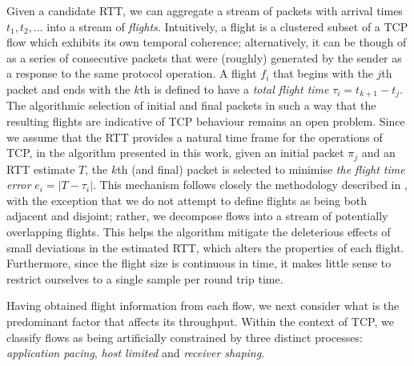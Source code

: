 Given a candidate RTT, we can aggregate a stream of packets with arrival times $t_1, t_2, \ldots$ into a stream of \emph{flights}. 
Intuitively, a flight is a clustered subset of a TCP flow which exhibits its own temporal coherence; alternatively, it can be though of as a series of consecutive packets that were (roughly) generated by the sender as a response to the same protocol operation. 
A flight $f_i$ that begins
with the $j$th packet and ends with the $k$th is defined to have a \emph{total flight time} $\tau_i = t_{k+1} - t_j$. 
The algorithmic selection of initial and final packets in such a way that the resulting flights are indicative of TCP behaviour remains an open problem. 
Since we assume that the RTT provides a natural time frame for the operations of TCP, in the algorithm presented in this work, given an initial packet $\pi_j$ and an RTT estimate $T$, the $k$th (and final) packet is selected to minimise \emph{the flight time error} $e_i = |T - \tau_i|$. 
This mechanism follows closely the methodology described in \cite{Zhang:2002p85}, with the exception that we do not attempt to define flights as being both adjacent and disjoint; rather, we decompose flows into a stream of potentially overlapping flights. 
This helps the algorithm mitigate the deleterious effects of small deviations in the estimated RTT, which alters the properties of each flight. 
Furthermore, since the flight size is continuous in time, it makes little sense to restrict ourselves to a single sample per round trip time.

Having obtained flight information from each flow, we next consider what is the predominant factor that affects its throughput. 
Within the context of TCP, we classify flows as being artificially constrained by three distinct processes: \emph{application pacing}, \emph{host limited} and \emph{receiver shaping}.

